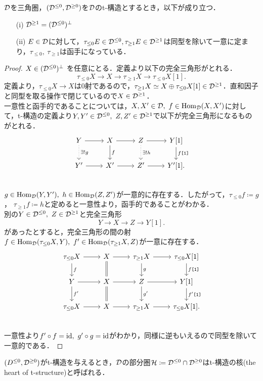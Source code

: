 \begin{prop}\cite[p.30]{BBD}\label{tau_functor}
	${\mathcal D}$を三角圏，$({\mathcal D}^{\le0},{\mathcal D}^{\ge 0})$を${\mathcal D}$のt-構造とするとき，以下が成り立つ．
		\begin{itemize}
				\item[(i)]${\mathcal D}^{\ge 1}=({\mathcal D}^{\le 0})^{\perp}$
				\item[(ii)]$E\in{\mathcal D}$に対して，$\tau_{\le 0}E\in{\mathcal D}^{\le 0}, \tau_{\ge 1}E\in{\mathcal D}^{\ge 1}$は同型を除いて一意に定まり，$\tau_{\le 0},\ \tau_{\ge 1}$は函手になっている．
		\end{itemize}
\end{prop}
	\begin{proof}
		$X\in\mathcal ({\mathcal D}^{\le 0})^\perp$ を任意にとる．定義より以下の完全三角形がとれる．
				\[\tau_{\le 0}X\rightarrow X \rightarrow \tau_{\ge 1}X\rightarrow \tau_{\le 0}X[1].\]
				定義より，$\tau_{\le 0}X\rightarrow X$は0射であるので，$\tau_{\ge 1}X\simeq X\oplus\tau_{\le 0}X[1]\in {\mathcal D}^{\ge 1}$．直和因子と同型を取る操作で閉じているので$X\in{\mathcal D}^{\ge 1}$．\\
				一意性と函手的であることについては，$X,X'\in\D,\ f\in\Hom_{\D}(X,X')$に対して，t-構造の定義より$Y,Y'\in{\mathcal D}^{\le 0},\ Z,Z'\in{\mathcal D}^{\ge 1}$で以下が完全三角形になるものがとれる．
			\[
		\begin{tikzcd}
			Y\ar[r]\ar[d,dotted,"\exists !g"]& X\ar[r]\ar[d,"f"]& Z\ar[d,dotted,"\exists !h"]\ar[r] & Y[1]\ar[d,"f\texttt{[1]}"]\\
			Y'\ar[r]& X'\ar[r]& Z'\ar[r] & Y'[1].\\
		\end{tikzcd}
			\]
			$g\in\Hom_{\D}(Y,Y'),\ h\in\Hom_{\D}(Z,Z')$が一意的に存在する．したがって，$\tau_{\le 0}f\coloneq g$， $\tau_{\ge 1}f\coloneq h$と定めると一意性より，函手的であることがわかる．\\
				別の$Y\in{\mathcal D}^{\le 0},\ Z\in{\mathcal D}^{\ge 1}$と完全三角形
\[Y\rightarrow X \rightarrow Z\rightarrow Y[1].\]
				があったとすると，完全三角形の間の射$f\in\Hom_{\D}(\tau_{\le 0}X,Y),\ f'\in\Hom_{\D}(\tau_{\ge 1}X,Z)$が一意に存在する．
			\[
		\begin{tikzcd}
			\tau_{\le 0}X\ar[r]\ar[d,"f"]& X\ar[r]\ar[d,equal]& \tau_{\ge 1}X\ar[r]\ar[d,"g"] & \tau_{\le 0}X[1]\ar[d,"f\texttt{[1]}"]\\
			Y\ar[r]\ar[d,"f'"]& X\ar[r]\ar[d,equal]& Z\ar[d,"g'"]\ar[r] & Y[1]\ar[d,"f'\texttt{[1]}"]\\
			\tau_{\le 0}X\ar[r]& X\ar[r]& \tau_{\ge 1}X\ar[r] & \tau_{\le 0}X[1].\\
		\end{tikzcd}
			\]
			一意性より$f'\circ f = \mathrm{id},\ g'\circ g=\mathrm{id}$がわかり，同様に逆もいえるので同型を除いて一意的である．
\end{proof}
\begin{defn}\cite[p.31]{BBD}
	$(D^{\le 0},{\mathcal D}^{\ge 0})$がt-構造を与えるとき，${\mathcal D}$の部分圏${\mathcal H}\coloneq{\mathcal D}^{\le 0}\cap{\mathcal D}^{\ge 0}$はt-構造の核(the heart of t-structure)と呼ばれる．
\end{defn}

